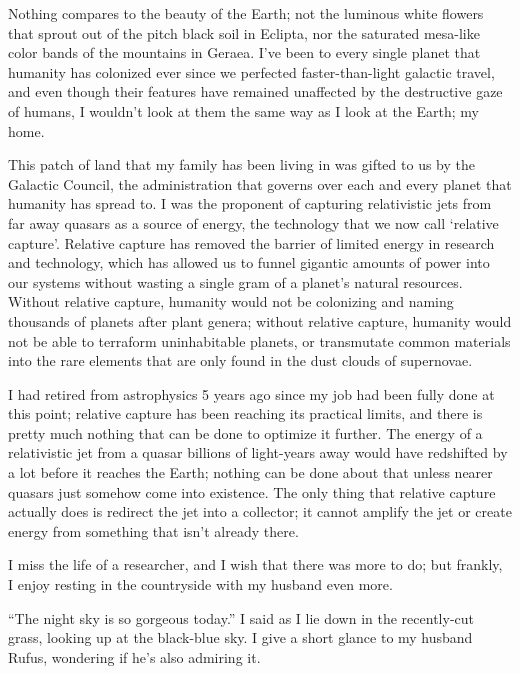 \documentclass{book}
\begin{document}
			Nothing compares to the beauty of the Earth; not the luminous white flowers that sprout
			out of the pitch black soil in Eclipta, nor the saturated mesa-like color bands of the
			mountains in Geraea. I've been to every single planet that humanity has colonized ever
			since we perfected faster-than-light galactic travel, and even though their features
			have remained unaffected by the destructive gaze of humans, I wouldn't look at them the
			same way as I look at the Earth; my home.

			This patch of land that my family has been living in was gifted to us by the Galactic
			Council, the administration that governs over each and every planet that humanity has
			spread to. I was the proponent of capturing relativistic jets from far away quasars as
			a source of energy, the technology that we now call `relative capture'. Relative
			capture has removed the barrier of limited energy in research and technology, which has
			allowed us to funnel gigantic amounts of power into our systems without wasting a single
			gram of a planet's natural resources. Without relative capture, humanity would not be
			colonizing and naming thousands of planets after plant genera; without relative
			capture, humanity would not be able to terraform uninhabitable planets, or transmutate
			common materials into the rare elements that are only found in the dust clouds of
			supernovae.

			I had retired from astrophysics 5 years ago since my job had been fully done at this
			point; relative capture has been reaching its practical limits, and there is pretty
			much nothing that can be done to optimize it further. The energy of a relativistic jet
			from a quasar billions of light-years away would have redshifted by a lot before it
			reaches the Earth; nothing can be done about that unless nearer quasars just somehow
			come into existence. The only thing that relative capture actually does is redirect the
			jet into a collector; it cannot amplify the jet or create energy from something that
			isn't already there.

			I miss the life of a researcher, and I wish that there was more to do; but frankly, I
			enjoy resting in the countryside with my husband even more.

			``The night sky is so gorgeous today.'' I said as I lie down in the recently-cut grass,
			looking up at the black-blue sky. I give a short glance to my husband Rufus, wondering
			if he's also admiring it.
\end{document}
